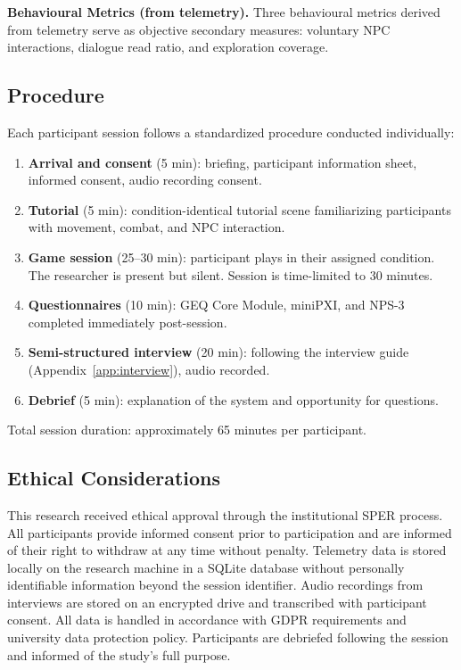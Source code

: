 \textbf{Behavioural Metrics (from telemetry).} Three behavioural metrics derived from telemetry serve as objective secondary measures: voluntary NPC interactions, dialogue read ratio, and exploration coverage.

\subsection{Procedure}

Each participant session follows a standardized procedure conducted individually:

\begin{enumerate}
\item \textbf{Arrival and consent} (5 min): briefing, participant information sheet, informed consent, audio recording consent.
\item \textbf{Tutorial} (5 min): condition-identical tutorial scene familiarizing participants with movement, combat, and NPC interaction.
\item \textbf{Game session} (25--30 min): participant plays in their assigned condition. The researcher is present but silent. Session is time-limited to 30 minutes.
\item \textbf{Questionnaires} (10 min): GEQ Core Module, miniPXI, and NPS-3 completed immediately post-session.
\item \textbf{Semi-structured interview} (20 min): following the interview guide (Appendix~\ref{app:interview}), audio recorded.
\item \textbf{Debrief} (5 min): explanation of the system and opportunity for questions.
\end{enumerate}

Total session duration: approximately 65 minutes per participant.

\subsection{Ethical Considerations}

This research received ethical approval through the institutional SPER process. All participants provide informed consent prior to participation and are informed of their right to withdraw at any time without penalty. Telemetry data is stored locally on the research machine in a SQLite database without personally identifiable information beyond the session identifier. Audio recordings from interviews are stored on an encrypted drive and transcribed with participant consent. All data is handled in accordance with GDPR requirements and university data protection policy. Participants are debriefed following the session and informed of the study's full purpose.

